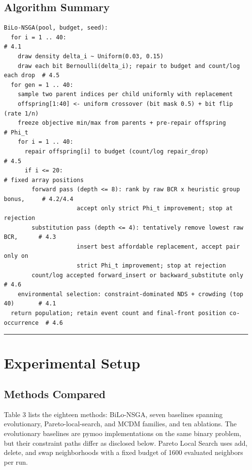 \documentclass[applsci,article,submit,moreauthors]{Definitions/mdpi}
\begin{document}
\subsection{Algorithm Summary}\label{algorithm-summary}

\begin{verbatim}
BiLo-NSGA(pool, budget, seed):
  for i = 1 .. 40:                                                             # 4.1
    draw density delta_i ~ Uniform(0.03, 0.15)
    draw each bit Bernoulli(delta_i); repair to budget and count/log each drop  # 4.5
  for gen = 1 .. 40:
    sample two parent indices per child uniformly with replacement
    offspring[1:40] <- uniform crossover (bit mask 0.5) + bit flip (rate 1/n)
    freeze objective min/max from parents + pre-repair offspring                # Phi_t
    for i = 1 .. 40:
      repair offspring[i] to budget (count/log repair_drop)                     # 4.5
      if i <= 20:                                                               # fixed array positions
        forward pass (depth <= 8): rank by raw BCR x heuristic group bonus,     # 4.2/4.4
                     accept only strict Phi_t improvement; stop at rejection
        substitution pass (depth <= 4): tentatively remove lowest raw BCR,      # 4.3
                     insert best affordable replacement, accept pair only on
                     strict Phi_t improvement; stop at rejection
        count/log accepted forward_insert or backward_substitute only           # 4.6
    environmental selection: constraint-dominated NDS + crowding (top 40)       # 4.1
  return population; retain event count and final-front position co-occurrence  # 4.6
\end{verbatim}

\begin{center}\rule{0.5\linewidth}{0.5pt}\end{center}

\section{Experimental Setup}\label{experimental-setup}

\subsection{Methods Compared}\label{methods-compared}

Table 3 lists the eighteen methods: BiLo-NSGA, seven baselines spanning evolutionary, Pareto-local-search, and MCDM families, and ten ablations. The evolutionary baselines are pymoo implementations on the same binary problem, but their constraint paths differ as disclosed below. Pareto Local Search uses add, delete, and swap neighborhoods with a fixed budget of 1600 evaluated neighbors per run.
\end{document}
